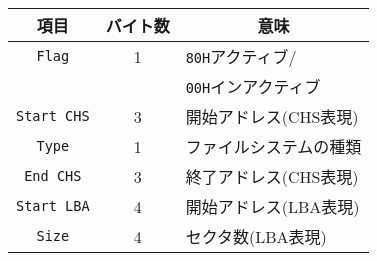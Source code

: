 \documentclass{standalone}
\begin{document}
\begin{tabular}{c|c|l}\hline\hline
  項目               & バイト数 & \multicolumn{1}{c}{意味} \\\hline
  \texttt{Flag}      & 1        & \texttt{80H}アクティブ/ \\
                     &          & \texttt{00H}インアクティブ \\
  \texttt{Start CHS} & 3        & 開始アドレス(CHS表現)    \\
  \texttt{Type}      & 1        & ファイルシステムの種類   \\
  \texttt{End CHS}   & 3        & 終了アドレス(CHS表現)    \\
  \texttt{Start LBA} & 4        & 開始アドレス(LBA表現)    \\
  \texttt{Size}      & 4        & セクタ数(LBA表現)        \\
\end{tabular}
\end{document}
